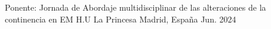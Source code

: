 

\begin{cventries}

  \cventry
    {Ponente: Jornada de Abordaje multidisciplinar de las alteraciones de la continencia en EM} %
    {H.U La Princesa} %
    {Madrid, España} %
    {Jun. 2024} %
    {}

\end{cventries}
